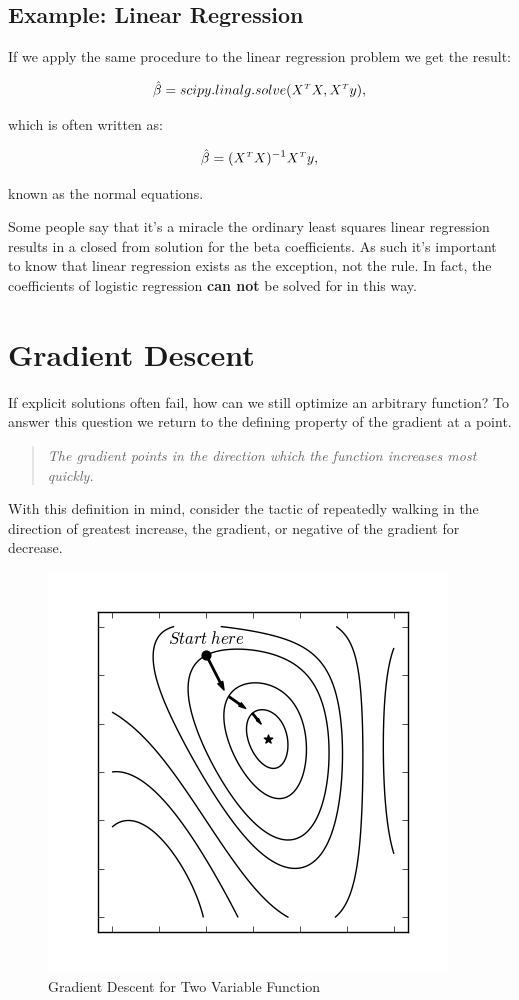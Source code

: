 \documentclass[a4paper, 12pt]{article}
\begin{document}
\subsection*{Example: Linear Regression}
If we apply the same procedure to the linear regression problem we get the result:

  $$ \hat{\beta} = scipy.linalg.solve(X^{\mathsmaller T}X, X^{\mathsmaller T} y), $$

\qquad which is often written as:

  $$ \hat{\beta} = (X^{\mathsmaller T}X)^{-1}X^{\mathsmaller T}y, $$

\qquad known as the normal equations.

\vspace{1pc}

Some people say that it's a miracle the ordinary least squares linear regression results in a closed from solution for the beta coefficients. As such it's important to know that linear regression exists as the exception, not the rule. In fact, the coefficients of logistic regression \textbf{can not} be solved for in this way.

\section*{Gradient Descent}

If explicit solutions often fail, how can we still optimize an arbitrary function? To answer this question we return to the defining property of the gradient at a point.

\begin{quote}
  \textit{The gradient points in the direction which the function increases most quickly.}
\end{quote}

With this definition in mind, consider the tactic of repeatedly walking in the direction of greatest increase, the gradient, or negative of the gradient for decrease.

\begin{figure}[H]
  \centering
    \includegraphics[scale=1]{images/two_var_gradient_descent.png}
  \caption{Gradient Descent for Two Variable Function} \label{fig:two_grad_desc}
\end{figure}
\end{document}
